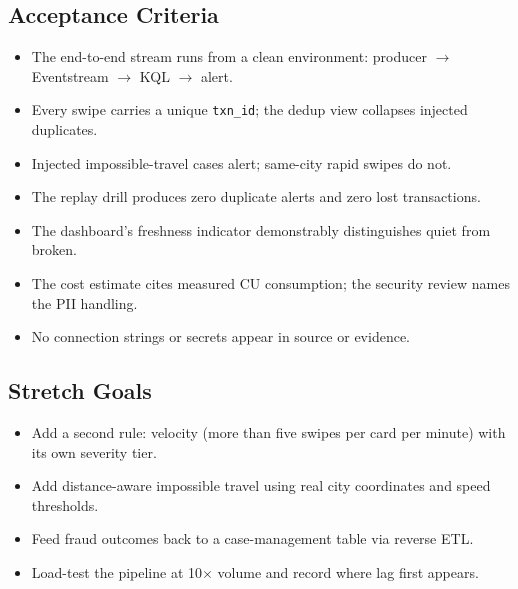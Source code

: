 \subsection*{Acceptance Criteria}
\begin{itemize}
    \item[\(\square\)] The end-to-end stream runs from a clean environment: producer $\rightarrow$ Eventstream $\rightarrow$ KQL $\rightarrow$ alert.
    \item[\(\square\)] Every swipe carries a unique \texttt{txn\_id}; the dedup view collapses injected duplicates.
    \item[\(\square\)] Injected impossible-travel cases alert; same-city rapid swipes do not.
    \item[\(\square\)] The replay drill produces zero duplicate alerts and zero lost transactions.
    \item[\(\square\)] The dashboard's freshness indicator demonstrably distinguishes quiet from broken.
    \item[\(\square\)] The cost estimate cites measured CU consumption; the security review names the PII handling.
    \item[\(\square\)] No connection strings or secrets appear in source or evidence.
\end{itemize}

\subsection*{Stretch Goals}
\begin{itemize}
    \item Add a second rule: velocity (more than five swipes per card per minute) with its own severity tier.
    \item Add distance-aware impossible travel using real city coordinates and speed thresholds.
    \item Feed fraud outcomes back to a case-management table via reverse ETL.
    \item Load-test the pipeline at 10$\times$ volume and record where lag first appears.
\end{itemize}

